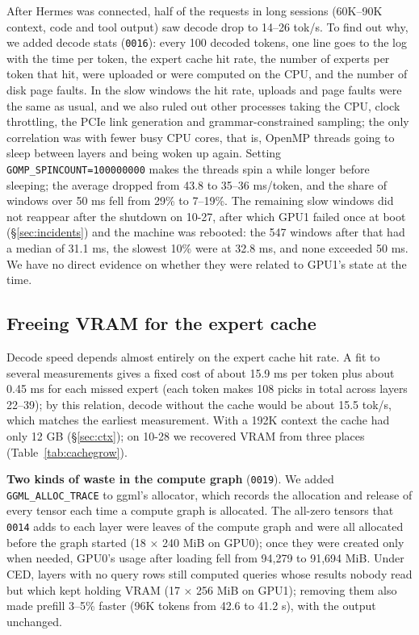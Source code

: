 \documentclass[11pt,a4paper]{article}
\newcommand{\code}[1]{\texttt{#1}}
\newcommand{\tps}{tok/s}
\begin{document}
After Hermes was connected, half of the requests in long sessions (60K--90K context, code and tool output) saw decode drop to 14--26 \tps{}. To find out why, we added decode stats (\code{0016}): every 100 decoded tokens, one line goes to the log with the time per token, the expert cache hit rate, the number of experts per token that hit, were uploaded or were computed on the CPU, and the number of disk page faults. In the slow windows the hit rate, uploads and page faults were the same as usual, and we also ruled out other processes taking the CPU, clock throttling, the PCIe link generation and grammar-constrained sampling; the only correlation was with fewer busy CPU cores, that is, OpenMP threads going to sleep between layers and being woken up again. Setting \code{GOMP\_SPINCOUNT=100000000} makes the threads spin a while longer before sleeping; the average dropped from 43.8 to 35--36 ms/token, and the share of windows over 50 ms fell from 29\% to 7--19\%. The remaining slow windows did not reappear after the shutdown on 10-27, after which GPU1 failed once at boot (\S\ref{sec:incidents}) and the machine was rebooted: the 547 windows after that had a median of 31.1 ms, the slowest 10\% were at 32.8 ms, and none exceeded 50 ms. We have no direct evidence on whether they were related to GPU1's state at the time.

\subsection{Freeing VRAM for the expert cache}
\label{sec:gpu0cache}

Decode speed depends almost entirely on the expert cache hit rate. A fit to several measurements gives a fixed cost of about 15.9 ms per token plus about 0.45 ms for each missed expert (each token makes 108 picks in total across layers 22--39); by this relation, decode without the cache would be about 15.5 \tps{}, which matches the earliest measurement. With a 192K context the cache had only 12 GB (\S\ref{sec:ctx}); on 10-28 we recovered VRAM from three places (Table~\ref{tab:cachegrow}).

\textbf{Two kinds of waste in the compute graph} (\code{0019}). We added \code{GGML\_ALLOC\_TRACE} to ggml's allocator, which records the allocation and release of every tensor each time a compute graph is allocated. The all-zero tensors that \code{0014} adds to each layer were leaves of the compute graph and were all allocated before the graph started (18 × 240 MiB on GPU0); once they were created only when needed, GPU0's usage after loading fell from 94,279 to 91,694 MiB. Under CED, layers with no query rows still computed queries whose results nobody read but which kept holding VRAM (17 × 256 MiB on GPU1); removing them also made prefill 3--5\% faster (96K tokens from 42.6 to 41.2 s), with the output unchanged.
\end{document}
